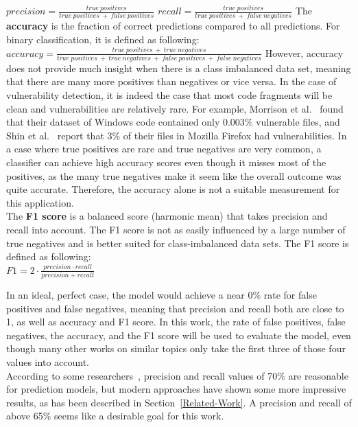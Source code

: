 \documentclass[
a4paper,
pagesize,
pdftex,
12pt,
twoside, %
BCOR=5mm, %
ngerman,
fleqn,
final,
]{scrartcl}
\begin{document}
	\mbox{}\newline
	$precision = \frac{true~positives}{true~positives~+~false~positives}$\newline
	\mbox{}\newline
	$recall = \frac{true~positives}{true~positives~+~false~negatives}$\newline
	\mbox{}\newline
	The \textbf{accuracy} is the fraction of correct predictions compared to all predictions. For binary classification, it is defined as following:  \newline
	\mbox{}\newline
	$accuracy = \frac{true~positives~+~true~negatives}{true~positives~+~true~negatives~+~false~positives~+~false~negatives}$\newline
	\mbox{}\newline
	However, accuracy does not provide much insight when there is a class imbalanced data set, meaning that there are many more positives than negatives or vice versa. In the case of vulnerability detection, it is indeed the case that most code fragments will be clean and vulnerabilities are relatively rare. For example, Morrison et al.~\cite{Morrison.2015} found that their dataset of Windows code contained only 0.003\% vulnerable files, and Shin et al.~\cite{Shin.2010} report that 3\% of their files in Mozilla Firefox had vulnerabilities. In a case where true positives are rare and true negatives are very common, a classifier can achieve high accuracy scores even though it misses most of the positives, as the many true negatives make it seem like the overall outcome was quite accurate. Therefore, the accuracy alone is not a suitable measurement for this application.\\
	The \textbf{F1 score} is a balanced score (harmonic mean) that takes precision and recall into account. The F1 score is not as easily influenced by a large number of true negatives and is better suited for class-imbalanced data sets. The F1 score is defined as following:\\
	\mbox{}\newline
	$F1 = 2 \cdot \frac{precision \cdot recall}{precision + recall}$
	\mbox{}\newline
	
	In an ideal, perfect case, the model would achieve a near 0\% rate for false positives and false negatives, meaning that precision and recall both are close to 1, as well as accuracy and F1 score. In this work, the rate of false positives, false negatives, the accuracy, and the F1 score will be used to evaluate the model, even though many other works on similar topics only take the first three of those four values into account.\\
	According to some researchers~\cite{Morrison.2015,Shin.2013,Neuhaus.2007}, precision and recall values of 70\% are reasonable for prediction models, but modern approaches have shown some more impressive results, as has been described in Section~\ref{Related-Work}. A precision and recall of above 65\% seems like a desirable goal for this work.
	
\end{document}
